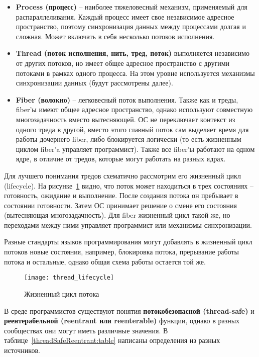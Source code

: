 \begin{itemize}
    \item\textbf{Process (процесс)} -- наиболее тяжеловесный механизм, применяемый для распараллеливания. Каждый процесс имеет свое независимое адресное пространство, поэтому синхронизация данных между процессами долгая и сложная. Может включать в себя несколько потоков исполнения.
    \item\textbf{Thread (поток исполнения, нить, тред, поток)} выполняется независимо от других потоков, но имеет общее адресное пространство с другими потоками в рамках одного процесса. На этом уровне используется механизмы синхронизации данных (будут рассмотрены далее).
    \item\textbf{Fiber (волокно)} -- легковесный поток выполнения. Также как и треды, fiber'ы имеют общее адресное пространство, однако используют совместную многозадачность вместо вытесняющей. ОС не переключает контекст из одного треда в другой, вместо этого главный поток сам выделяет время для работы дочернего fiber, либо блокируется логически (то есть жизненным циклом fiber'a управляет программист). Также все fiber'ы работают на одном ядре, в отличие от тредов, которые могут работать на разных ядрах.
\end{itemize}

Для лучшего понимания тредов схематично рассмотрим его жизненный цикл (lifecycle). На рисунке~\ref{threadLifecycle:image} видно, что поток может находиться в трех состояниях -- готовность, ожидание и выполнение. После создания потока он пребывает в состоянии готовности. Затем ОС принимает решение о смене его состояния (вытесняющая многозадачность). Для fiber жизненный цикл такой же, но переходами между ними управляет программист или механизмы синхронизации.

Разные стандарты языков программирования могут добавлять в жизненный цикл потоков новые состояния, например, блокировка потока, прерывание работы потока и остальные, однако общая схема работы остается той же.

\begin{figure}[H]
    \texttt{[image: thread\_lifecycle]}
    \caption{Жизненный цикл потока}
    \label{threadLifecycle:image}
\end{figure}

\sloppy
В среде программистов существуют понятия \textbf{потокобезопасной (thread-safe)} и \textbf{реентерабельной (reentrant или reenterable)} функции, однако в разных сообществах они могут иметь различные значения. В таблице~\ref{threadSafeReentrant:table} написаны определения из разных источников.


